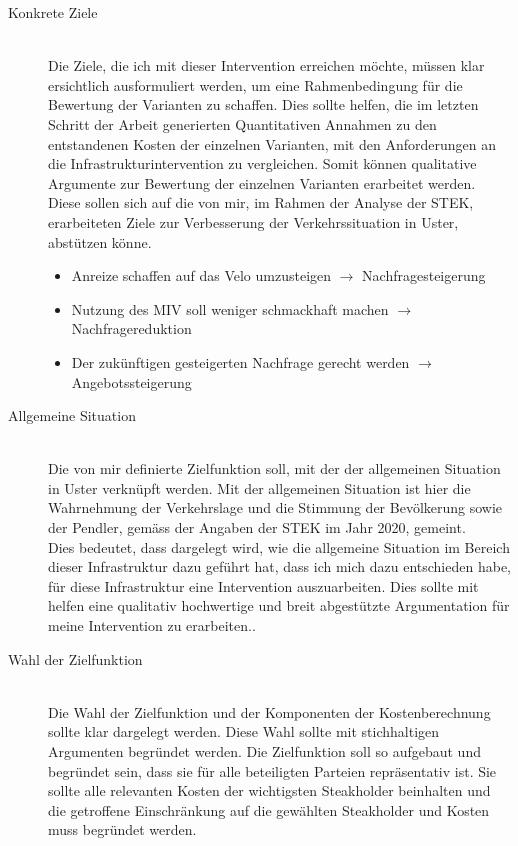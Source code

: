 \documentclass[
  paper=a4,                         %
  fontsize=11pt,                    %
  DIV=12,                           %
  BCOR=10mm,                        %
  twoside=true,                     %
  parskip=half,                     %
  headings=small,                   %
 ]{scrartcl}
\begin{document}
\begin{description}
\item[Konkrete Ziele] \hfill \\
\vspace{2mm}
Die Ziele, die ich mit dieser Intervention erreichen möchte, müssen klar ersichtlich ausformuliert werden, um eine Rahmenbedingung für die Bewertung der Varianten zu schaffen. Dies sollte helfen, die im letzten Schritt der Arbeit generierten Quantitativen Annahmen zu den entstandenen Kosten der einzelnen Varianten, mit den Anforderungen an die Infrastrukturintervention zu vergleichen. Somit können qualitative Argumente zur Bewertung der einzelnen Varianten erarbeitet werden. Diese sollen sich auf die von mir, im Rahmen der Analyse der STEK, erarbeiteten Ziele zur Verbesserung der Verkehrssituation in Uster, abstützen könne.

\begin{itemize}
\item Anreize schaffen auf das Velo umzusteigen $\rightarrow$ Nachfragesteigerung
\item Nutzung des MIV soll weniger schmackhaft machen $\rightarrow$ Nachfragereduktion
\item Der zukünftigen gesteigerten Nachfrage gerecht werden $\rightarrow$ Angebotssteigerung
\end{itemize}

\item[Allgemeine Situation] \hfill \\
\vspace{2mm}
Die von mir definierte Zielfunktion soll, mit der der allgemeinen Situation in Uster verknüpft werden. Mit der allgemeinen Situation ist hier die Wahrnehmung der Verkehrslage und die Stimmung der Bevölkerung sowie der Pendler, gemäss der Angaben der STEK im Jahr 2020, gemeint.  \\
Dies bedeutet, dass dargelegt wird, wie die allgemeine Situation im Bereich dieser Infrastruktur dazu geführt hat, dass ich mich dazu entschieden habe, für diese Infrastruktur eine Intervention auszuarbeiten. Dies sollte mit helfen eine qualitativ hochwertige und breit abgestützte Argumentation für meine Intervention zu erarbeiten..

\item[Wahl der Zielfunktion] \hfill \\
\vspace{2mm}
Die Wahl der Zielfunktion und der Komponenten der Kostenberechnung sollte klar dargelegt werden. Diese Wahl sollte mit stichhaltigen Argumenten begründet werden.
Die Zielfunktion soll so aufgebaut und begründet sein, dass sie für alle beteiligten Parteien repräsentativ ist. Sie sollte alle relevanten Kosten der wichtigsten Steakholder beinhalten und die getroffene Einschränkung auf die gewählten Steakholder und Kosten muss begründet werden.\\
\end{description}
\end{document}
